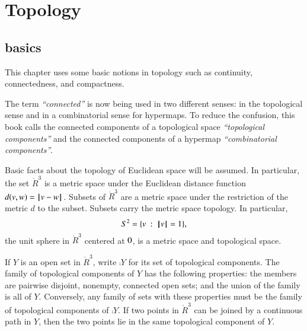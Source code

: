 \section{Topology}\label{sec:topology}

\subsection{basics}

This chapter uses some basic
notions in topology such as continuity, connectedness, and compactness.

\begin{remark} The term {\it ``connected''} is now being used in
two different senses: in the topological sense and in a combinatorial
sense for hypermaps.    To reduce the confusion, this book calls the connected components
of a topological space {\it ``topological components''} and the connected
components of a hypermap {\it ``combinatorial components''}.
\end{remark}


Basic facts about the topology of Euclidean space will be assumed.  In particular,
the set $\ring{R}^3$ is a metric space under the
Euclidean distance function $d(v,w) = {\hskip0.1em|\hskip-0.15em|\hskip0.1em}v - w{\hskip0.1em|\hskip-0.15em|\hskip0.1em}$.  Subsets of
$\ring{R}^3$ are a metric space under the restriction of the metric
$d$ to the subset. Subsets carry the metric space topology.
In particular, $$S^2 = \{ v \ :\  {{\hskip0.1em|\hskip-0.15em|\hskip0.1em} v{\hskip0.1em|\hskip-0.15em|\hskip0.1em}} = 1\},$$ the unit sphere in
$\ring{R}^3$ centered at $0$, is a metric space and topological space.

If $Y$ is an open set in $\ring{R}^3$, write
$\comp{Y}$ for its set of topological components.
The family of topological components of $Y$ has the following properties:
the members are pairwise disjoint, nonempty, connected open sets; and the
union of the family is all of $Y$.
Conversely, any family of sets with these properties must be the
family of topological components of $\comp{Y}$.
If two
points in $\ring{R}^3$ 
can be joined by a continuous path in $Y$,
then the two points lie in the same topological component of $Y$.
 






